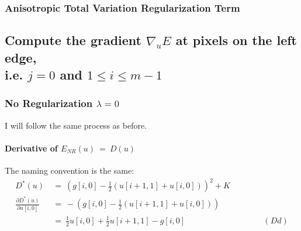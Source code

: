 \documentclass{report}
\begin{document}
			\subsubsection{Anisotropic Total Variation Regularization Term}
			\startsubsection
			\closesection
		\closesection
		
		\subsection{Compute the gradient $\nabla_u E$ at pixels on the left edge, \\ i.e. $j = 0$ and $1 \leq i \leq m-1$}
		\startsubsection
			\subsubsection{No Regularization $\lambda = 0$}
			\startsubsection
				I will follow the same process as before.
				\vspace{-0.4cm} \paragraph{Derivative of  $E_{NR}(u) \ = \ D(u)$}
				\startsubsection
					The naming convention is the same:
					\vspace{-0.2cm}
					\begin{align*}
						D^*(u) \ & = \ (g[i,0] - \frac{1}{2} (u[i+1,1] + u[i,0]))^2 + K \\
						\frac{\partial D^*(u)}{\partial u[i,0]} \ & = \ - (g[i,0] - \frac{1}{2} (u[i+1,1] + u[i,0])) \\
						& = \ \frac{1}{2} u[i,0]  + \frac{1}{2} u[i+1,1] - g[i,0] \hspace{4cm} (Dd)
					\end{align*}
				\closesection
			\closesection
\end{document}
